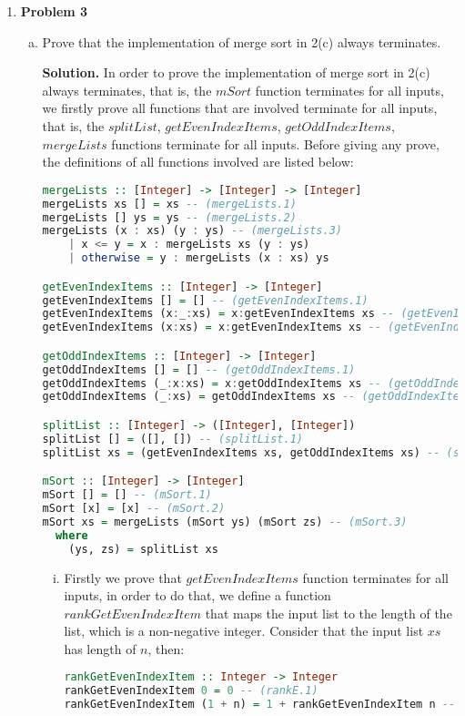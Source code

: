 \documentclass[11pt]{article}
\theoremstyle{definition}
\begin{document}
\begin{enumerate} \itemsep 20pt

\item[] \textbf{Problem 3}

\begin{enumerate}[(a)]
\item Prove that the implementation of merge sort in 2(c) always terminates.

\textbf{Solution.} In order to prove the implementation of merge sort in 2(c) always terminates, that is, the $mSort$ function terminates for
all inputs, we firstly prove all functions that are involved terminate for all inputs, that is, the $splitList$, 
$getEvenIndexItems$, $getOddIndexItems$, $mergeLists$ functions terminate for all inputs. Before giving any prove, the
definitions of all functions involved are listed below:

\begin{lstlisting}[language=Haskell]
mergeLists :: [Integer] -> [Integer] -> [Integer]
mergeLists xs [] = xs -- (mergeLists.1)
mergeLists [] ys = ys -- (mergeLists.2)
mergeLists (x : xs) (y : ys) -- (mergeLists.3)
	| x <= y = x : mergeLists xs (y : ys)
	| otherwise = y : mergeLists (x : xs) ys

getEvenIndexItems :: [Integer] -> [Integer]
getEvenIndexItems [] = [] -- (getEvenIndexItems.1)
getEvenIndexItems (x:_:xs) = x:getEvenIndexItems xs -- (getEvenIndexItems.2)
getEvenIndexItems (x:xs) = x:getEvenIndexItems xs -- (getEvenIndexItems.3)

getOddIndexItems :: [Integer] -> [Integer]
getOddIndexItems [] = [] -- (getOddIndexItems.1)
getOddIndexItems (_:x:xs) = x:getOddIndexItems xs -- (getOddIndexItems.2)
getOddIndexItems (_:xs) = getOddIndexItems xs -- (getOddIndexItems.3)

splitList :: [Integer] -> ([Integer], [Integer])
splitList [] = ([], []) -- (splitList.1)
splitList xs = (getEvenIndexItems xs, getOddIndexItems xs) -- (splitList.2)

mSort :: [Integer] -> [Integer]
mSort [] = [] -- (mSort.1)
mSort [x] = [x] -- (mSort.2)
mSort xs = mergeLists (mSort ys) (mSort zs) -- (mSort.3)
  where
    (ys, zs) = splitList xs
\end{lstlisting}

\begin{enumerate}[i.]

\item Firstly we prove that $getEvenIndexItems$ function terminates for all inputs, in order to do that, we define a 
function $rankGetEvenIndexItem$ that maps the input list to the length of the list, which is a non-negative integer.
Consider that the input list $xs$ has length of $n$, then:
\begin{lstlisting}[language=Haskell]
rankGetEvenIndexItem :: Integer -> Integer
rankGetEvenIndexItem 0 = 0 -- (rankE.1)
rankGetEvenIndexItem (1 + n) = 1 + rankGetEvenIndexItem n -- (rankE.2)
\end{lstlisting}


\end{enumerate}
\end{enumerate}
\end{enumerate}
\end{document}
